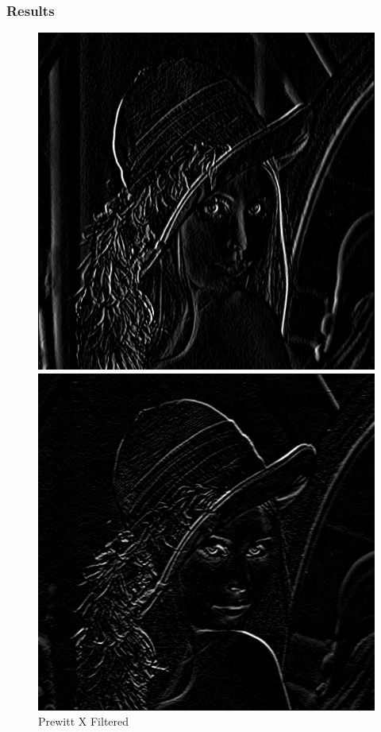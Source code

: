 \documentclass[11pt,a4paper]{article}
\begin{document}
\subsubsection*{Results}
\begin{figure}[ht!]
    \centering
    \begin{minipage}{0.3\textwidth}
        \centering
        \includegraphics[width=\linewidth]{figs/task2/prewitt_x_filtered.png}
        \caption{Prewitt X Filtered}
    \end{minipage}
    \quad
    \begin{minipage}{0.3\textwidth}
        \centering
        \includegraphics[width=\linewidth]{figs/task2/prewitt_y_filtered.png}

\end{minipage}
\end{figure}
\end{document}
